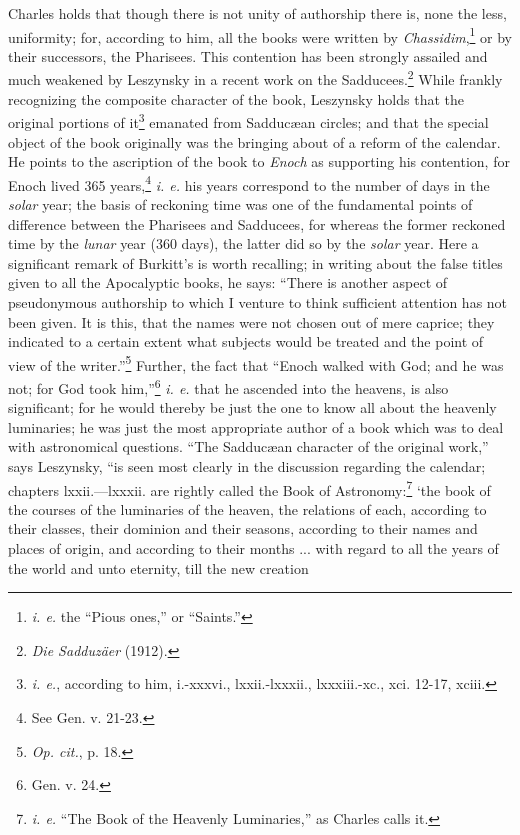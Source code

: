 Charles holds that though there is not unity of
authorship there is, none the less, uniformity; for,
according to him, all the books were written by
\emph{Chassidim},\footnote{\emph{i. e.} the “Pious ones,” or “Saints.”} or by their successors, the Pharisees.
This contention has been strongly assailed and much
weakened by Leszynsky in a recent work on the
Sadducees.\footnote{\emph{Die Sadduzäer} (1912).} While frankly recognizing the composite
character of the book, Leszynsky holds that
the original portions of it\footnote{\emph{i. e.}, according to him, i.-xxxvi., lxxii.-lxxxii., lxxxiii.-xc.,
xci. 12-17, xciii.} emanated from Sadducæan
circles; and that the special object of the book
originally was the bringing about of a reform of the
calendar. He points to the ascription of the book
to \emph{Enoch} as supporting his contention, for Enoch
lived 365 years,\footnote{See Gen. v. 21-23.} \emph{i. e.} his years correspond to the
number of days in the \emph{solar} year; the basis of reckoning
time was one of the fundamental points of
difference between the Pharisees and Sadducees,
for whereas the former reckoned time by the \emph{lunar}
year (360 days), the latter did so by the \emph{solar} year.
Here a significant remark of Burkitt’s is worth
recalling; in writing about the false titles given
to all the Apocalyptic books, he says: “There is
another aspect of pseudonymous authorship to which
I venture to think sufficient attention has not been
given. It is this, that the names were not chosen
out of mere caprice; they indicated to a certain
extent what subjects would be treated and the point
of view of the writer.”\footnote{\emph{Op. cit.}, p. 18.} Further, the fact that
“Enoch walked with God; and he was not; for
God took him,”\footnote{Gen. v. 24.} \emph{i. e.} that he ascended into the
heavens, is also significant; for he would thereby
be just the one to know all about the heavenly
luminaries; he was just the most appropriate author
of a book which was to deal with astronomical
questions. “The Sadducæan character of the original
work,” says Leszynsky, “is seen most clearly
in the discussion regarding the calendar; chapters
lxxii.—lxxxii. are rightly called the Book of Astronomy:\footnote{\emph{i. e.} “The Book of the Heavenly Luminaries,” as Charles
calls it.}
‘the book of the courses of the luminaries of
the heaven, the relations of each, according to their
classes, their dominion and their seasons, according
to their names and places of origin, and according
to their months ... with regard to all the years
of the world and unto eternity, till the new creation
